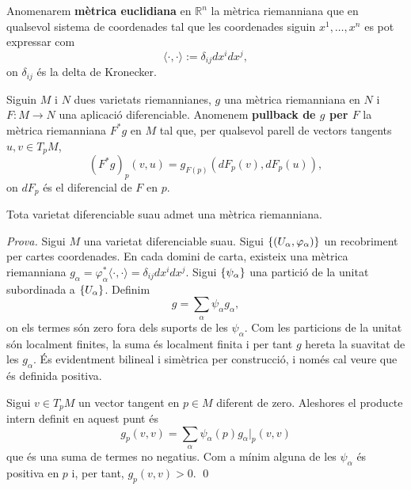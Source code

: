 \begin{defi}
    Anomenarem \textbf{mètrica euclidiana} en $\mathbb R^n$ la mètrica riemanniana que en qualsevol sistema de coordenades tal que les coordenades siguin $x^1,\dots,x^n$ es pot expressar com
    \begin{equation*}
        \langle\cdot,\cdot\rangle := \delta_{ij}dx^idx^j,
    \end{equation*}
    on $\delta_{ij}$ és la delta de Kronecker.
\end{defi}

\begin{defi}\label{def:pullback_metric}
    Siguin $M$ i $N$ dues varietats riemannianes, $g$ una mètrica riemanniana en $N$ i $F:M\to N$ una aplicació diferenciable. Anomenem \textbf{pullback de $g$ per $F$} la mètrica riemanniana $F^*g$ en $M$ tal que, per qualsevol parell de vectors tangents $u,v\in T_pM$,
    \begin{equation*}
        (F^*g)_p(v,u) = g_{F(p)}(dF_p(v),dF_p(u)),
    \end{equation*}
    on $dF_p$ és el diferencial de $F$ en $p$.
\end{defi}

\begin{prop}
    Tota varietat diferenciable suau admet una mètrica riemanniana.
\end{prop}
{
    \color{black} \textit{Prova.}
    Sigui $M$ una varietat diferenciable suau. Sigui $\{(U_\alpha,\varphi_\alpha)\}$ un recobriment per cartes coordenades. En cada domini de carta, existeix una mètrica riemanniana $g_\alpha = \varphi_\alpha^*\langle\cdot,\cdot\rangle = \delta_{ij}dx^idx^j$. Sigui $\{\psi_\alpha\}$ una partició de la unitat subordinada a $\{U_\alpha\}$. Definim 
    \begin{equation*}
        g = \sum_{\alpha} \psi_\alpha g_\alpha,
    \end{equation*}
    on els termes són zero fora dels suports de les $\psi_\alpha$. Com les particions de la unitat són localment finites, la suma és localment finita i per tant $g$ hereta la suavitat de les $g_\alpha$. És evidentment bilineal i simètrica per construcció, i només cal veure que és definida positiva.

    Sigui $v\in T_pM$ un vector tangent en $p\in M$ diferent de zero. Aleshores el producte intern definit en aquest punt és
    \begin{equation*}
        g_p(v,v) = \sum_\alpha \psi_\alpha(p) g_\alpha|_p(v,v)
    \end{equation*}
    que és una suma de termes no negatius. Com a mínim alguna de les $\psi_\alpha$ és positiva en $p$ i, per tant, $g_p(v,v) > 0$.
    \qed
}

